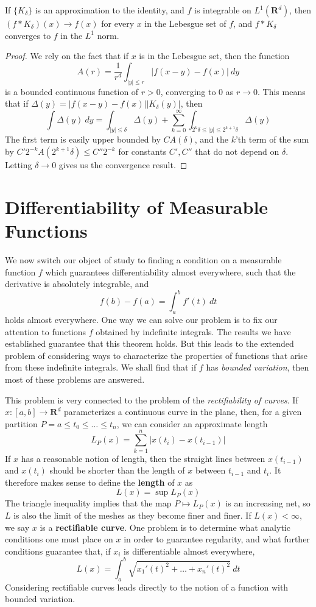 \begin{theorem}
    If $\{ K_\delta \}$ is an approximation to the identity, and $f$ is integrable on $L^1(\mathbf{R}^d)$, then $(f * K_\delta)(x) \to f(x)$ for every $x$ in the Lebesgue set of $f$, and $f * K_\delta$ converges to $f$ in the $L^1$ norm.
\end{theorem}
\begin{proof}
    We rely on the fact that if $x$ is in the Lebesgue set, then the function
    \[ A(r) = \frac{1}{r^d} \int_{|y| \leq r} |f(x-y) - f(x)|\ dy \]
    is a bounded continuous function of $r > 0$, converging to $0$ as $r \to 0$. This means that if $\Delta(y) = |f(x-y) - f(x)| |K_\delta(y)|$, then
    \[ \int \Delta(y)\ dy = \int_{|y| \leq \delta} \Delta(y) + \sum_{k = 0}^\infty \int_{2^k \delta \leq |y| \leq 2^{k+1} \delta} \Delta(y) \]
    The first term is easily upper bounded by $CA(\delta)$, and the $k$'th term of the sum by $C'2^{-k}A(2^{k+1}\delta) \leq C''2^{-k}$ for constants $C',C''$ that do not depend on $\delta$. Letting $\delta \to 0$ gives us the convergence result.
\end{proof}

\section{Differentiability of Measurable Functions}

We now switch our object of study to finding a condition on a measurable function $f$ which guarantees differentiability almost everywhere, such that the derivative is absolutely integrable, and
%
\[ f(b) - f(a) = \int_a^b f'(t)\ dt \]
%
holds almost everywhere. One way we can solve our problem is to fix our attention to functions $f$ obtained by indefinite integrals. The results we have established guarantee that this theorem holds. But this leads to the extended problem of considering ways to characterize the properties of functions that arise from these indefinite integrals. We shall find that if $f$ has {\it bounded variation}, then most of these problems are answered.

This problem is very connected to the problem of the {\it rectifiability of curves}. If $x: [a,b] \to \mathbf{R}^d$ parameterizes a continuous curve in the plane, then, for a given partition $P = a \leq t_0 \leq \dots \leq t_n$, we can consider an approximate length
%
\[ L_P(x) = \sum_{k = 1}^n |x(t_i) - x(t_{i-1})| \]
%
If $x$ has a reasonable notion of length, then the straight lines between $x(t_{i-1})$ and $x(t_i)$ should be shorter than the length of $x$ between $t_{i-1}$ and $t_i$. It therefore makes sense to define the {\bf length} of $x$ as
%
\[ L(x) = \sup L_P(x) \]
%
The triangle inequality implies that the map $P \mapsto L_P(x)$ is an increasing net, so $L$ is also the limit of the meshes as they become finer and finer. If $L(x) < \infty$, we say $x$ is a {\bf rectifiable curve}. One problem is to determine what analytic conditions one must place on $x$ in order to guarantee regularity, and what further conditions guarantee that, if $x_i$ is differentiable almost everywhere,
%
\[ L(x) = \int_a^b \sqrt{x_1'(t)^2 + \dots + x_n'(t)^2}\ dt \]
%
Considering rectifiable curves leads directly to the notion of a function with bounded variation.

